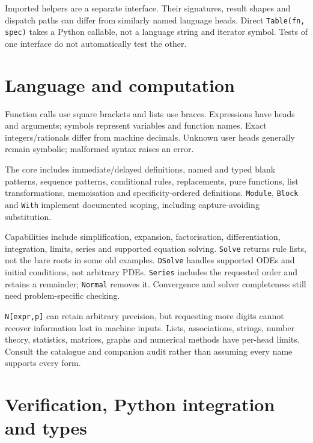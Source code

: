 \documentclass[11pt,a4paper]{article}
\begin{document}
Imported helpers are a separate interface. Their signatures, result shapes and dispatch paths can differ from similarly named language heads. Direct \texttt{Table(fn, spec)} takes a Python callable, not a language string and iterator symbol. Tests of one interface do not automatically test the other.



\section{Language and computation}
Function calls use square brackets and lists use braces. Expressions have heads and arguments; symbols represent variables and function names. Exact integers/rationals differ from machine decimals. Unknown user heads generally remain symbolic; malformed syntax raises an error.

The core includes immediate/delayed definitions, named and typed blank patterns, sequence patterns, conditional rules, replacements, pure functions, list transformations, memoisation and specificity-ordered definitions. \texttt{Module}, \texttt{Block} and \texttt{With} implement documented scoping, including capture-avoiding substitution.

Capabilities include simplification, expansion, factorisation, differentiation, integration, limits, series and supported equation solving. \texttt{Solve} returns rule lists, not the bare roots in some old examples. \texttt{DSolve} handles supported ODEs and initial conditions, not arbitrary PDEs. \texttt{Series} includes the requested order and retains a remainder; \texttt{Normal} removes it. Convergence and solver completeness still need problem-specific checking.

\texttt{N[expr,p]} can retain arbitrary precision, but requesting more digits cannot recover information lost in machine inputs. Lists, associations, strings, number theory, statistics, matrices, graphs and numerical methods have per-head limits. Consult the catalogue and companion audit rather than assuming every name supports every form.

\section{Verification, Python integration and types}
\end{document}
